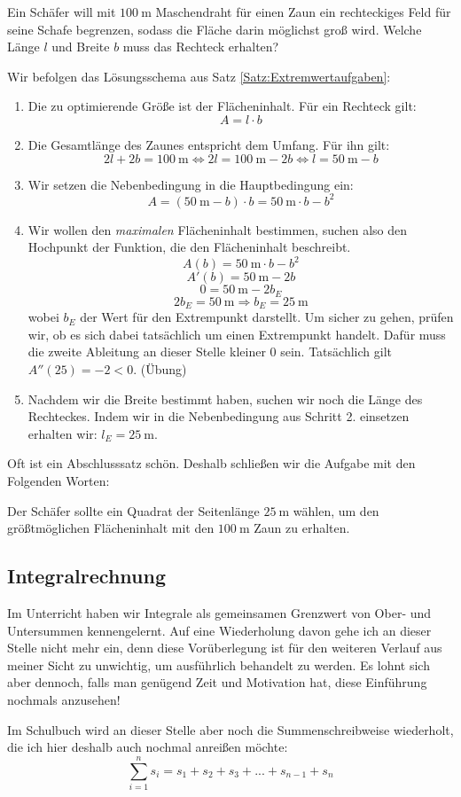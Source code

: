\documentclass[ngerman, 12pt]{nssheetxea}
\begin{document}
\begin{example}
Ein Schäfer will mit $\SI{100}{\meter}$ Maschendraht für einen Zaun ein rechteckiges Feld für seine Schafe begrenzen, sodass die Fläche darin möglichst groß wird. Welche Länge $l$ und Breite $b$ muss das Rechteck erhalten?\par
Wir befolgen das Lösungsschema aus Satz \ref{Satz:Extremwertaufgaben}:
\begin{enumerate}
\item Die zu optimierende Größe ist der Flächeninhalt. Für ein Rechteck gilt: 
\[ A=l\cdot b \]
\item Die Gesamtlänge des Zaunes entspricht dem Umfang. Für ihn gilt:
\[ 2l + 2b = \SI{100}{\meter}	\Leftrightarrow 2l = \SI{100}{\meter} - 2b \Leftrightarrow l = \SI{50}{\meter}	- b \]
\item Wir setzen die Nebenbedingung in die Hauptbedingung ein: 
\[ A= (\SI{50}{\meter} -b)\cdot b =  \SI{50}{\meter} \cdot b - b^2 \]
\item Wir wollen den \textit{maximalen} Flächeninhalt bestimmen, suchen also den Hochpunkt der Funktion, die den Flächeninhalt beschreibt.
\[ A(b)=  \SI{50}{\meter} \cdot b - b^2\]
\[ A'(b)= \SI{50}{\meter} - 2b \]
\[ 0 = \SI{50}{\meter} - 2b_E \]
\[ 2b_E = \SI{50}{\meter} \Rightarrow b_E = \SI{25}{\meter} \]
wobei $b_E$ der Wert für den Extrempunkt darstellt. Um sicher zu gehen, prüfen wir, ob es sich dabei tatsächlich um einen Extrempunkt handelt. Dafür muss die zweite Ableitung an dieser Stelle kleiner $0$ sein. Tatsächlich gilt $A''(25)=-2 < 0$. (Übung)
\item Nachdem wir die Breite bestimmt haben, suchen wir noch die Länge des Rechteckes. Indem wir in die Nebenbedingung aus Schritt 2. einsetzen erhalten wir: $l_E=\SI{25}{\meter}$. 
\end{enumerate}
Oft ist ein Abschlusssatz schön. Deshalb schließen wir die Aufgabe mit den Folgenden Worten: \par
Der Schäfer sollte ein Quadrat der Seitenlänge $\SI{25}{\meter}$ wählen, um den größtmöglichen Flächeninhalt mit den $\SI{100}{\meter}$ Zaun zu erhalten.
\end{example}

\newpage

\subsection{Integralrechnung}
Im Unterricht haben wir Integrale als gemeinsamen Grenzwert von Ober- und Untersummen kennengelernt. Auf eine Wiederholung davon gehe ich an dieser Stelle nicht mehr ein, denn diese Vorüberlegung ist für den weiteren Verlauf aus meiner Sicht zu unwichtig, um ausführlich behandelt zu werden. Es lohnt sich aber dennoch, falls man genügend Zeit und Motivation hat, diese Einführung nochmals anzusehen! \par
Im Schulbuch wird an dieser Stelle aber noch die Summenschreibweise wiederholt, die ich hier deshalb auch nochmal anreißen möchte:
\[ \sum_{i=1}^n s_i = s_1 + s_2 + s_3 + ... + s_{n-1} + s_n  \]
\end{document}

